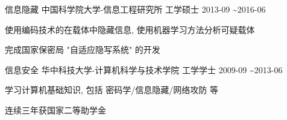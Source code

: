 


\begin{cventries}
	
	
	\cventry
	{信息隐藏} %
	{中国科学院大学-信息工程研究所} %
	{工学硕士} %
	{2013-09 \textasciitilde 2016-06} %
	{ %
		\begin{cvitems}
			\item{使用编码技术的在载体中隐藏信息, 使用机器学习方法分析可疑载体}
			\item {完成国家保密局 "自适应隐写系统" 的开发}
		\end{cvitems}
	}
	
	\cventry
	{信息安全} %
	{华中科技大学-计算机科学与技术学院} %
	{工学学士} %
	{2009-09 \textasciitilde 2013-06} %
	{ %
		\begin{cvitems}
			\item{学习计算机基础知识, 包括 密码学/信息隐藏/网络攻防 等}
            \item{连续三年获国家二等助学金}
		\end{cvitems}
	}
	
	
\end{cventries}